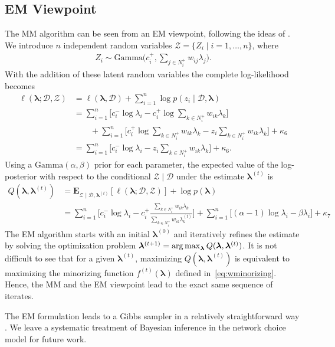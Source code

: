 \subsection{EM Viewpoint}

The MM algorithm can be seen from an EM viewpoint, following the ideas of \citet{caron2012efficient}.
We introduce $n$ independent random variables $\mathcal{Z} = \{ Z_i \mid i = 1, \ldots, n \}$, where
\begin{align*}
Z_i \sim \text{Gamma} \bigg( c^+_i, \sum_{j \in N^+_i} w_{ij} \lambda_j \bigg).
\end{align*}
With the addition of these latent random variables the complete log-likelihood becomes
\begin{align*}
\ell(\bm{\lambda} ; \mathcal{D}, \mathcal{Z})
    &= \ell(\bm{\lambda}, \mathcal{D}) + \sum_{i = 1}^n \log p(z_i \mid \mathcal{D}, \bm{\lambda}) \\
    &= \sum_{i = 1}^n \bigg[ c^-_i \log \lambda_i - c^+_i \log \sum_{k \in N^+_i} w_{ik} \lambda_k \bigg] \\
    &\qquad +\sum_{i = 1}^n \bigg[  c^+_i \log \sum_{k \in N^+_i} w_{ik} \lambda_k - z_i \sum_{k \in N^+_i} w_{ik} \lambda_k \bigg] + \kappa_6 \\
    &= \sum_{i = 1}^n \bigg[ c^-_i \log \lambda_i - z_i \sum_{k \in N^+_i} w_{ik} \lambda_k \bigg] + \kappa_6.
\end{align*}
Using a $\text{Gamma}(\alpha, \beta)$ prior for each parameter, the expected value of the log-posterior with respect to the conditional $\mathcal{Z} \mid \mathcal{D}$ under the estimate $\bm{\lambda}^{(t)}$ is
\begin{align*}
Q(\bm{\lambda}, \bm{\lambda}^{(t)})
    &= \mathbf{E}_{\mathcal{Z} \mid \mathcal{D}, \bm{\lambda}^{(t)}} \left[ \ell(\bm{\lambda} ; \mathcal{D}, \mathcal{Z}) \right]
       + \log p(\bm{\lambda}) \\
    &=\sum_{i = 1}^n \bigg[ c^-_i \log \lambda_i - c^+_i \frac{\sum_{k \in N^+_i} w_{ik} \lambda_k}{\sum_{k \in N^+_i} w_{ik} \lambda^{(t)}_k} \bigg]
      + \sum_{i = 1}^n \bigg[ (\alpha -1) \log \lambda_i - \beta \lambda_i \bigg] + \kappa_7
\end{align*}
The EM algorithm starts with an initial $\bm{\lambda}^{(0)}$ and iteratively refines the estimate by solving the optimization problem $\bm{\lambda}^{(t+1)} = \operatorname*{arg\,max}_{\bm{\lambda}} Q(\bm{\lambda}, \bm{\lambda}^{(t)})$.
It is not difficult to see that for a given $\bm{\lambda}^{(t)}$, maximizing $Q(\bm{\lambda}, \bm{\lambda}^{(t)})$ is equivalent to maximizing the minorizing function $f^{(t)}(\bm{\lambda})$ defined in~\eqref{eq:wminorizing}.
Hence, the MM and the EM viewpoint lead to the exact same sequence of iterates.

The EM formulation leads to a Gibbs sampler in a relatively straightforward way \citep{caron2012efficient}.
We leave a systematic treatment of Bayesian inference in the network choice model for future work.
